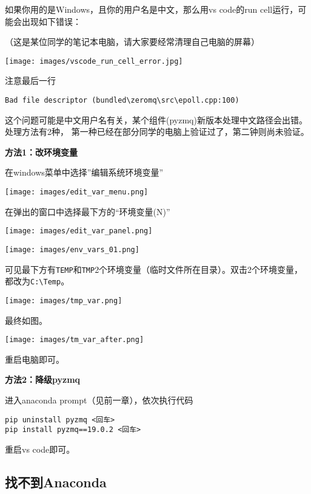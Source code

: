 \documentclass[
  letterpaper,
  DIV=11,
  numbers=noendperiod]{scrreprt}
\begin{document}
如果你用的是Windows，且你的用户名是中文，那么用vs code的run
cell运行，可能会出现如下错误：

（这是某位同学的笔记本电脑，请大家要经常清理自己电脑的屏幕）

\texttt{[image: images/vscode\_run\_cell\_error.jpg]}

注意最后一行

\begin{verbatim}
Bad file descriptor (bundled\zeromq\src\epoll.cpp:100)
\end{verbatim}

这个问题可能是中文用户名有关，某个组件(pyzmq)新版本处理中文路径会出错。处理方法有2种，
第一种已经在部分同学的电脑上验证过了，第二钟则尚未验证。

\textbf{方法1：改环境变量}

在windows菜单中选择''编辑系统环境变量''

\texttt{[image: images/edit\_var\_menu.png]}

在弹出的窗口中选择最下方的``环境变量(N)''

\texttt{[image: images/edit\_var\_panel.png]}

\texttt{[image: images/env\_vars\_01.png]}

可见最下方有\texttt{TEMP}和\texttt{TMP}2个环境变量（临时文件所在目录）。双击2个环境变量，都改为\texttt{C:\textbackslash{}Temp}。

\texttt{[image: images/tmp\_var.png]}

最终如图。

\texttt{[image: images/tm\_var\_after.png]}

重启电脑即可。

\textbf{方法2：降级pyzmq}

进入anaconda prompt（见前一章），依次执行代码

\begin{verbatim}
pip uninstall pyzmq <回车>
pip install pyzmq==19.0.2 <回车>
\end{verbatim}

重启vs code即可。

\hypertarget{ux627eux4e0dux5230anaconda}{%
\subsection{找不到Anaconda}\label{ux627eux4e0dux5230anaconda}}
\end{document}
